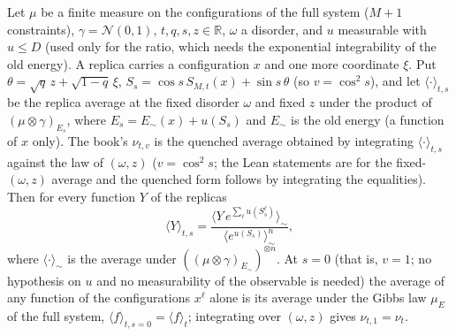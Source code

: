 \begin{proposition}[The interpolating system, (2.33)--(2.35), and $\nu_{t,1}=\nu_t$]\label{prop:sg-tal:perceptron-cavity-path}
  \leanok
Let $\mu$ be a finite measure on the configurations of the full system ($M+1$ constraints), $\gamma=\mathcal N(0,1)$,
$t,q,s,z\in\mathbb R$, $\omega$ a disorder, and $u$ measurable with $u\le D$ (used only for the ratio, which needs the exponential integrability of
the old energy). A replica carries a configuration $x$ and one more coordinate $\xi$. Put
$\theta=\sqrt q\,z+\sqrt{1-q}\,\xi$, $S_s=\cos s\,S_{M,t}(x)+\sin s\,\theta$ (so $v=\cos^2 s$), and let $\langle\cdot\rangle_{t,s}$ be the replica average at the
fixed disorder $\omega$ and fixed $z$ under the
product of $(\mu\otimes\gamma)_{E_s}$, where $E_s=E_\sim(x)+u(S_s)$ and $E_\sim$ is the old energy (a function of $x$ only). The book's
$\nu_{t,v}$ is the quenched average obtained by integrating $\langle\cdot\rangle_{t,s}$ against the law of $(\omega,z)$ ($v=\cos^2s$; the Lean
statements are for the fixed-$(\omega,z)$ average and the quenched form follows by integrating the equalities). Then for every
function $Y$ of the replicas
\[
 \langle Y\rangle_{t,s}=\frac{\bigl\langle Y\,e^{\sum_{\ell}u(S_s^\ell)}\bigr\rangle_{\sim}}{\bigl\langle e^{u(S_s)}\bigr\rangle_{\sim}^{n}},
\]
where $\langle\cdot\rangle_\sim$ is the average under $((\mu\otimes\gamma)_{E_\sim})^{\otimes n}$. At $s=0$ (that is, $v=1$; no hypothesis on $u$ and no
measurability of the observable is needed) the average of any function of the configurations $x^\ell$ alone is its average under the Gibbs law
$\mu_{E}$ of the full system, $\langle f\rangle_{t,s=0}=\langle f\rangle_t$; integrating over $(\omega,z)$ gives $\nu_{t,1}=\nu_t$.
\end{proposition}
